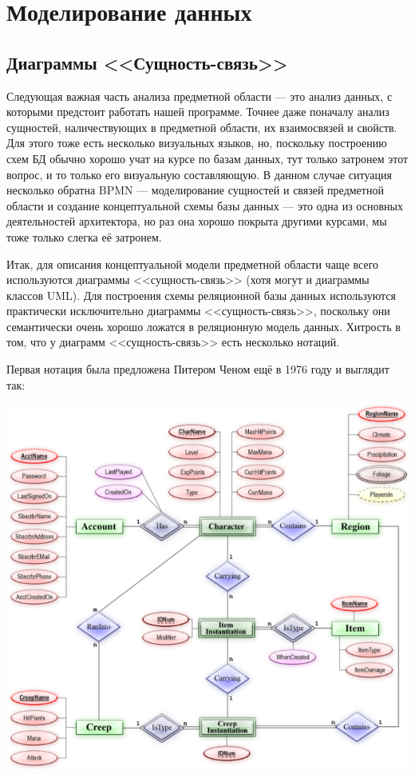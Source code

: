 \documentclass{../../text-style}
\begin{document}
\section{Моделирование данных}

\subsection{Диаграммы <<Сущность-связь>>}

Следующая важная часть анализа предметной области --- это анализ данных, с которыми предстоит работать нашей программе. Точнее даже поначалу анализ сущностей, наличествующих в предметной области, их взаимосвязей и свойств. Для этого тоже есть несколько визуальных языков, но, поскольку построению схем БД обычно хорошо учат на курсе по базам данных, тут только затронем этот вопрос, и то только его визуальную составляющую. В данном случае ситуация несколько обратна BPMN --- моделирование сущностей и связей предметной области и создание концептуальной схемы базы данных --- это одна из основных деятельностей архитектора, но раз она хорошо покрыта другими курсами, мы тоже только слегка её затронем.

Итак, для описания концептуальной модели предметной области чаще всего используются диаграммы <<сущность-связь>> (хотя могут и диаграммы классов UML). Для построения схемы реляционной базы данных используются практически исключительно диаграммы <<сущность-связь>>, поскольку они семантически очень хорошо ложатся в реляционную модель данных. Хитрость в том, что у диаграмм <<сущность-связь>> есть несколько нотаций.

Первая нотация была предложена Питером Ченом ещё в 1976 году и выглядит так:

\begin{center}
    \includegraphics[width=\textwidth]{erChenNotation.png}
\end{center}
\end{document}
